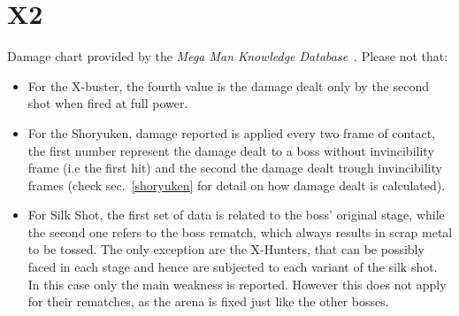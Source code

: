 \section{X2}
Damage chart provided by the \emph{Mega Man Knowledge Database}~\cite{wiki:damage_chart_X2}. 
Please not that:
\begin{itemize}
\item For the X-buster, the fourth value is the damage dealt only by the second shot when fired at full power.
\item For the Shoryuken, damage reported is applied every two frame of contact, the first number represent the damage dealt to a boss without invincibility frame (i.e the first hit) and the second the damage dealt trough invincibility frames (check sec.~\ref{shoryuken} for detail on how damage dealt is calculated).

\item For Silk Shot, the first set of data is related to the boss' original stage, while the second one refers to the boss rematch, which always results in scrap metal to be tossed. The only exception are the X-Hunters, that can be possibly faced in each stage and hence are subjected to each variant of the silk shot. In this case only the main weakness is reported. However this does not apply for their rematches, as the arena is fixed just like the other bosses.%
\end{itemize}

